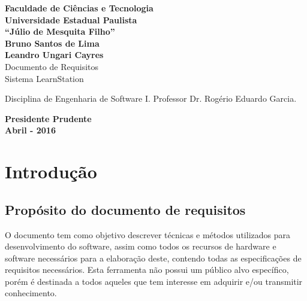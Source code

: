 \documentclass[12pt,a4paper,onecolumn,titlepage]{article}
\begin{document}

\begin{titlepage} %
	
	\vfill
	\begin{center}
	
		{\large \textbf{Faculdade de Ciências e Tecnologia\\Universidade Estadual Paulista\\``Júlio de Mesquita Filho''}} \\[3cm]
		{\large \textbf{Bruno Santos de Lima}}\\
		{\large \textbf{Leandro Ungari Cayres}}\\[4cm]
		{\Large Documento de Requisitos}\\
		{\Large Sistema LearnStation}\\[4cm]

	\hspace{.45\textwidth} %
	\begin{minipage}{.5\textwidth}
		\large Disciplina de Engenharia de Software I. Professor Dr. Rogério Eduardo Garcia.\\[0.5cm]
	\end{minipage}

	\vfill
	\vspace{1.5cm}
	
	\large \textbf{Presidente Prudente\\}
	\large \textbf{Abril - 2016}
	
	\end{center}
	
\end{titlepage}

\section{Introdução}
\label{sect:intro}

\subsection{Propósito do documento de requisitos}

O documento tem como objetivo descrever técnicas e métodos utilizados para desenvolvimento do software, assim como todos os recursos de hardware e software necessários para a elaboração deste, contendo todas as especificações de requisitos necessários. Esta ferramenta não possui um público alvo específico, porém é destinada a todos aqueles que tem interesse em adquirir e/ou transmitir conhecimento.
\end{document}
